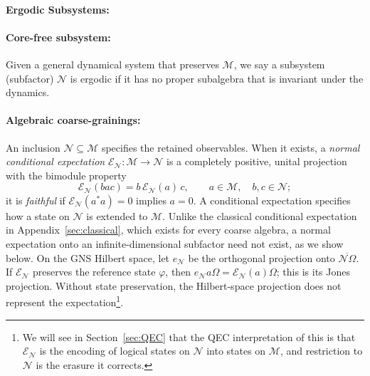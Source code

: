\documentclass[a4paper,11pt]{article}
\theoremstyle{definition}
\newcommand{\mN}{\mathcal{N}}
\newcommand{\mM}{\mathcal{M}}
\newcommand{\mE}{\mathcal{E}}
\begin{document}

\paragraph{Ergodic Subsystems:} 


\paragraph{Core-free subsystem:} Given a general dynamical system that preserves $\mM$, we say a subsystem (subfactor) $\mN$ is ergodic if it has no proper subalgebra that is invariant under the dynamics.


\paragraph{Algebraic coarse-grainings:}
An inclusion $\mN\subseteq\mM$ specifies the retained observables.
When it exists, a \emph{normal conditional expectation}
$\mE_{\mN}:\mM\to\mN$ is a completely positive, unital projection
with the bimodule property
\begin{equation}
 \mE_{\mN}(bac)=b\,\mE_{\mN}(a)\,c,
 \qquad a\in\mM,\quad b,c\in\mN;
 \label{eq:CE-bimodular}
\end{equation}
it is \emph{faithful} if $\mE_{\mN}(a^*a)=0$ implies $a=0$. A conditional expectation specifies how a state on $\mN$ is extended to $\mM$.
Unlike the classical conditional expectation in Appendix~\ref{sec:classical}, which exists for every coarse algebra,
a normal expectation onto an infinite-dimensional subfactor need not exist, as we show below. On the GNS Hilbert space, let $e_{\mN}$
be the orthogonal projection onto $\overline{\mN\Omega}$.
If $\mE_{\mN}$ preserves the reference state $\varphi$, then
$e_{\mN}a\Omega=\mE_{\mN}(a)\Omega$; this is its Jones projection.
Without state preservation, the Hilbert-space projection does not represent the expectation\footnote{We will see in Section~\ref{sec:QEC} that the QEC interpretation of this is that $\mE_{\mN}$ is the encoding of logical states on $\mN$
into states on $\mM$, and restriction to $\mN$ is the erasure it corrects.}.
\end{document}
